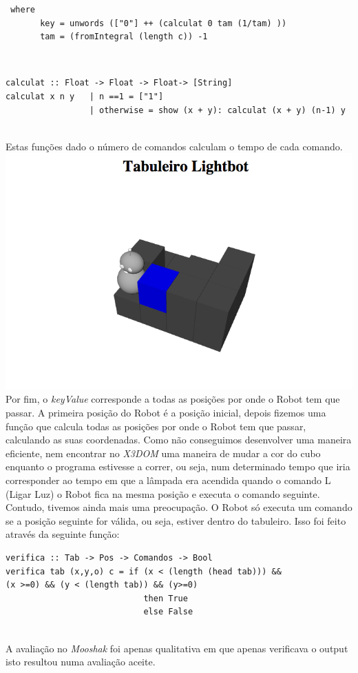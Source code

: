 \documentclass[a4paper,12pt,portuges]{article}
\begin{document}
\begin{verbatim}
 where
       key = unwords (["0"] ++ (calculat 0 tam (1/tam) ))
       tam = (fromIntegral (length c)) -1
\end{verbatim}
\\
\begin{verbatim}
calculat :: Float -> Float -> Float-> [String]
calculat x n y   | n ==1 = ["1"]    
                 | otherwise = show (x + y): calculat (x + y) (n-1) y

\end{verbatim}
\\
Estas funções dado o número de comandos calculam o tempo de cada comando.
\\
\includegraphics[scale=0.6]{tabuleiro1}
\\
Por fim, o \textit{keyValue} corresponde a todas as posições por onde o Robot tem que passar. A primeira posição do Robot é a posição inicial, depois fizemos uma função que calcula todas as posições por onde o Robot tem que passar, calculando as suas coordenadas.
Como não conseguimos desenvolver uma maneira eficiente, nem encontrar no \textit{X3DOM} uma maneira de mudar a cor do cubo enquanto o programa estivesse a correr, ou seja, num determinado tempo que iria corresponder ao tempo em que a lâmpada era acendida quando o comando L (Ligar Luz) o Robot fica na mesma posição e executa o comando seguinte.
\\
Contudo, tivemos ainda mais uma preocupação. O Robot só executa um comando se a posição seguinte for válida, ou seja, estiver dentro do tabuleiro. Isso foi feito através da seguinte função:\\

\begin{verbatim}
verifica :: Tab -> Pos -> Comandos -> Bool
verifica tab (x,y,o) c = if (x < (length (head tab))) && 
(x >=0) && (y < (length tab)) && (y>=0)
                            then True
                            else False
\end{verbatim}
\\
A avaliação no \textit{Mooshak} foi apenas qualitativa em que apenas verificava o output isto resultou numa avaliação aceite.
\end{document}
